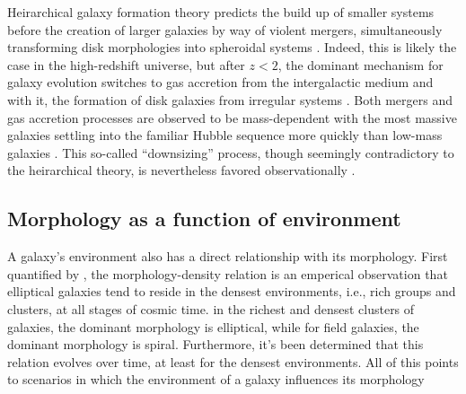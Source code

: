 

Heirarchical galaxy formation theory predicts the build up of smaller systems before the creation of larger galaxies by way of violent mergers, simultaneously transforming disk morphologies into spheroidal systems \citep{Driver2013,Bluck2009,Man2012}. Indeed, this is likely the case in the high-redshift universe, but after $z<2$, the dominant mechanism for galaxy evolution switches to gas accretion from the intergalactic medium and with it, the formation of disk galaxies from irregular systems \citep{Conselice2013}. Both mergers and gas accretion processes are observed to be mass-dependent with the most massive galaxies settling into the familiar Hubble sequence more quickly than low-mass galaxies \citep{Buitrago2013,Conselice2011,Mortlock2013}. This so-called ``downsizing'' process, though seemingly contradictory to the heirarchical theory, is nevertheless favored observationally \citep{Cowie1996, Brinchmann2000, Bundy2005, Cimatti2006}. 




\subsection{Morphology as a function of environment}
A galaxy's environment also has a direct relationship with its morphology. First quantified by \cite{Dressler1980}, the morphology-density relation is an emperical observation that elliptical galaxies tend to reside in the densest environments, i.e., rich groups and clusters, at all stages of cosmic time. in the richest and densest clusters of galaxies, the dominant morphology is elliptical, while for field galaxies, the dominant morphology is spiral. Furthermore, it's been determined that this relation evolves over time, at least for the densest environments. All of this points to scenarios in which the environment of a galaxy influences its morphology \citep[e.g.,][]{Fasano2000, Shen2003, Smith2005, Peng2010}

